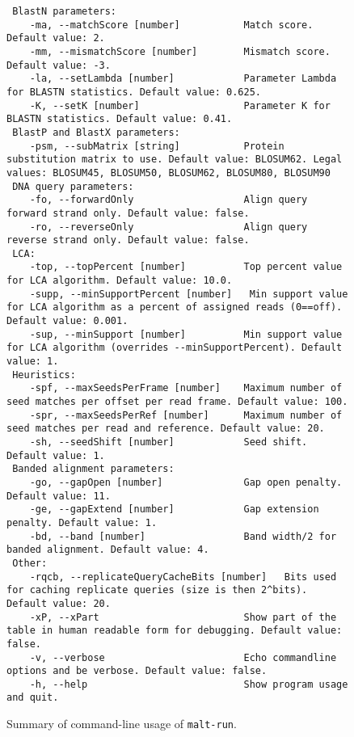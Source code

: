 \documentclass[11pt]{article}
\begin{document}
\begin{figure}[h]
{\begin{verbatim}
 BlastN parameters:
	-ma, --matchScore [number]           Match score. Default value: 2.
	-mm, --mismatchScore [number]        Mismatch score. Default value: -3.
	-la, --setLambda [number]            Parameter Lambda for BLASTN statistics. Default value: 0.625.
	-K, --setK [number]                  Parameter K for BLASTN statistics. Default value: 0.41.
 BlastP and BlastX parameters:
	-psm, --subMatrix [string]           Protein substitution matrix to use. Default value: BLOSUM62. Legal values: BLOSUM45, BLOSUM50, BLOSUM62, BLOSUM80, BLOSUM90
 DNA query parameters:
	-fo, --forwardOnly                   Align query forward strand only. Default value: false.
	-ro, --reverseOnly                   Align query reverse strand only. Default value: false.
 LCA:
	-top, --topPercent [number]          Top percent value for LCA algorithm. Default value: 10.0.
	-supp, --minSupportPercent [number]   Min support value for LCA algorithm as a percent of assigned reads (0==off). Default value: 0.001.
	-sup, --minSupport [number]          Min support value for LCA algorithm (overrides --minSupportPercent). Default value: 1.
 Heuristics:
	-spf, --maxSeedsPerFrame [number]    Maximum number of seed matches per offset per read frame. Default value: 100.
	-spr, --maxSeedsPerRef [number]      Maximum number of seed matches per read and reference. Default value: 20.
	-sh, --seedShift [number]            Seed shift. Default value: 1.
 Banded alignment parameters:
	-go, --gapOpen [number]              Gap open penalty. Default value: 11.
	-ge, --gapExtend [number]            Gap extension penalty. Default value: 1.
	-bd, --band [number]                 Band width/2 for banded alignment. Default value: 4.
 Other:
	-rqcb, --replicateQueryCacheBits [number]   Bits used for caching replicate queries (size is then 2^bits). Default value: 20.
	-xP, --xPart                         Show part of the table in human readable form for debugging. Default value: false.
	-v, --verbose                        Echo commandline options and be verbose. Default value: false.
	-h, --help                           Show program usage and quit.
\end{verbatim}
}
\caption{Summary of command-line usage of {\tt malt-run}.}\label{fig:malt-run-usage}
\end{figure}


\FloatBarrier

{\small


}

\printindex
\end{document}
